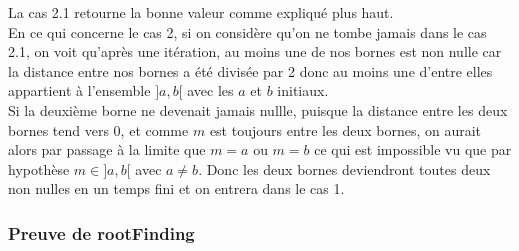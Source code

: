 \documentclass[a4paper, 12pt]{article}
\begin{document}
La cas 2.1 retourne la bonne valeur comme expliqué plus haut. \\
En ce qui concerne le cas 2, si on considère qu'on ne tombe jamais dans le cas 2.1, on voit qu'après une itération, au moins une de nos bornes est non nulle car la distance entre nos bornes a été divisée par 2 donc au moins une d'entre elles appartient à l'ensemble \( ]a, b[ \) avec les \( a \) et \( b \) initiaux. \\
Si la deuxième borne ne devenait jamais nullle, puisque la distance entre les deux bornes tend vers 0, et comme \( m \) est toujours entre les deux bornes, on aurait alors par passage à la limite que \( m = a \) ou \( m = b \) ce qui est impossible vu que par hypothèse \( m \in ]a, b[ \) avec \( a \neq b \).
Donc les deux bornes deviendront toutes deux non nulles en un temps fini et on entrera dans le cas 1.

\newpage

\subsubsection{Preuve de rootFinding}
\end{document}

